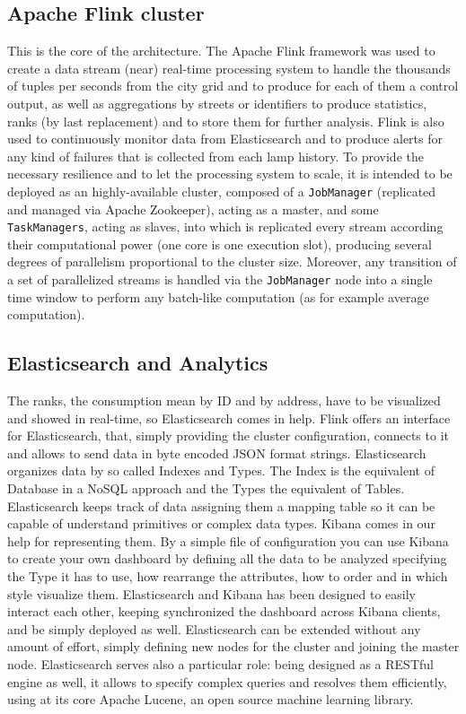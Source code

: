 \subsection{Apache Flink cluster}
This is the core of the architecture. The Apache Flink framework was used to create a data stream (near) real-time processing system to handle the thousands of tuples per seconds from the city grid and to produce for each of them a control output, as well as aggregations by streets or identifiers to produce statistics, ranks (by last replacement) and to store them for further analysis. Flink is also used to continuously monitor data from Elasticsearch and to produce alerts for any kind of failures that is collected from each lamp history. To provide the necessary resilience and to let the processing system to scale, it is intended to be deployed as an highly-available cluster, composed of a \texttt{JobManager} (replicated and managed via Apache Zookeeper), acting as a master, and some \texttt{TaskManagers}, acting as slaves, into which is replicated every stream according their computational power (one core is one execution slot), producing several degrees of parallelism proportional to the cluster size. Moreover, any transition of a set of parallelized streams is handled via the \texttt{JobManager} node into a single time window to perform any batch-like computation (as for example average computation).

\subsection{Elasticsearch and Analytics}
The ranks, the consumption mean by ID and by address, have to be visualized and showed in real-time, so Elasticsearch comes in help. Flink offers an interface for Elasticsearch, that, simply providing the cluster configuration, connects to it and allows to send data in byte encoded JSON format strings. Elasticsearch organizes data by so called Indexes and Types. The Index is the equivalent of Database in a NoSQL approach and the Types the equivalent of Tables. Elasticsearch keeps track of data assigning them a mapping table so it can be capable of understand primitives or complex data types. Kibana comes in our help for representing them. By a simple file of configuration you can use Kibana to create your own dashboard by defining all the data to be analyzed specifying the Type it has to use, how rearrange the attributes, how to order and in which style visualize them. Elasticsearch and Kibana has been designed to easily interact each other, keeping synchronized the dashboard across Kibana clients, and be simply deployed as well. Elasticsearch can be extended without any amount of effort, simply defining new nodes for the cluster and joining the master node. Elasticsearch serves also a particular role: being designed as a RESTful engine as well, it allows to specify complex queries and resolves them efficiently, using at its core Apache Lucene, an open source machine learning library.


